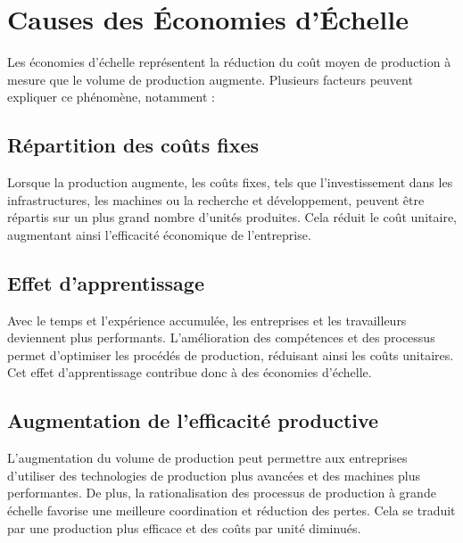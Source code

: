 \chapter*{Causes des Économies d'Échelle}
\setcounter{chapter}{1}



Les économies d'échelle représentent la réduction du coût moyen de production à
mesure que le volume de production augmente. Plusieurs facteurs peuvent
expliquer ce phénomène, notamment :

\section{Répartition des coûts fixes}

Lorsque la production augmente, les coûts fixes, tels que l'investissement dans
les infrastructures, les machines ou la recherche et développement, peuvent
être répartis sur un plus grand nombre d'unités produites. Cela réduit le coût
unitaire, augmentant ainsi l'efficacité économique de l'entreprise.

\section{Effet d'apprentissage}

Avec le temps et l'expérience accumulée, les entreprises et les travailleurs
deviennent plus performants. L'amélioration des compétences et des processus
permet d'optimiser les procédés de production, réduisant ainsi les coûts
unitaires. Cet effet d'apprentissage contribue donc à des économies d'échelle.

\section{Augmentation de l'efficacité productive}

L'augmentation du volume de production peut permettre aux entreprises
d'utiliser des technologies de production plus avancées et des machines plus
performantes. De plus, la rationalisation des processus de production à grande
échelle favorise une meilleure coordination et réduction des pertes. Cela se
traduit par une production plus efficace et des coûts par unité diminués.
